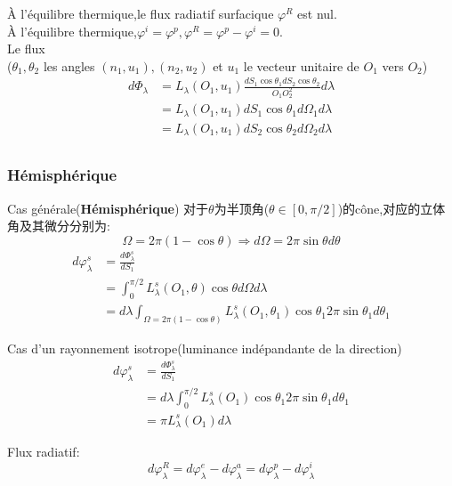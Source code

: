 \`A l'\'equilibre thermique,le flux radiatif surfacique $\varphi^R$ est nul.\\
\`A l'\'equilibre thermique,$\varphi^i=\varphi^p,\varphi^R=\varphi^p-\varphi^i=0$. \\
Le flux\\
($\theta_1,\theta_2$ les angles $(n_1,u_1),(n_2,u_2)$ et $u_1$ le vecteur unitaire de $O_1$ vers $O_2$)
\begin{equation}
\begin{split}
d \Phi_{\lambda } & = L_{\lambda}(O_1,u_1) \frac{d S_1 \cos \theta_1  d S_2 \cos \theta_2}{O_1 O_2^2} d \lambda \\
& =  L_{\lambda}(O_1,u_1) d S_1 \cos \theta_1 d\Omega_1 d \lambda \\
& = L_{\lambda}(O_1,u_1) d S_2 \cos \theta_2 d\Omega_2 d \lambda\\
\end{split}
\end{equation}
\subsubsection{H\'emisph\'erique}
Cas g\'en\'erale(\textbf{H\'emisph\'erique})
对于$\theta$为半顶角($\theta \in [0,\pi/2]$)的c\^one,对应的立体角及其微分分别为:
$$\Omega = 2\pi(1-\cos \theta) \Rightarrow d\Omega=2\pi \sin \theta d\theta $$
\begin{equation}
	\begin{split}
d\varphi_{\lambda }^s  & = \frac{d \Phi_{\lambda }^s}{dS_1} \\
 & =  \int_{0}^{\pi/2}L_{\lambda }^s(O_1,\theta)\cos \theta d\Omega d \lambda \\
 & = d \lambda \int_{\Omega = 2\pi(1-\cos \theta)} L_{\lambda }^s(O_1,\theta_1)\cos \theta_1 2\pi \sin\theta_1 d\theta_1
	\end{split}
\end{equation}

Cas d'un rayonnement isotrope(luminance ind\'epandante de la direction)
\begin{equation}
	\begin{split}
d\varphi_{\lambda }^s &= \frac{d \Phi_{\lambda }^s}{dS_1}\\
&=d \lambda \int_{0}^{\pi/2}L_{\lambda }^s(O_1)\cos \theta_1 2\pi \sin\theta_1 d\theta_1 \\
&= \pi L_{\lambda }^s(O_1)d\lambda
	\end{split}
\end{equation}

Flux radiatif:
$$d\varphi_{\lambda }^R =d\varphi_{\lambda }^e - d\varphi_{\lambda }^a = d\varphi_{\lambda }^p - d\varphi_{\lambda }^i$$

